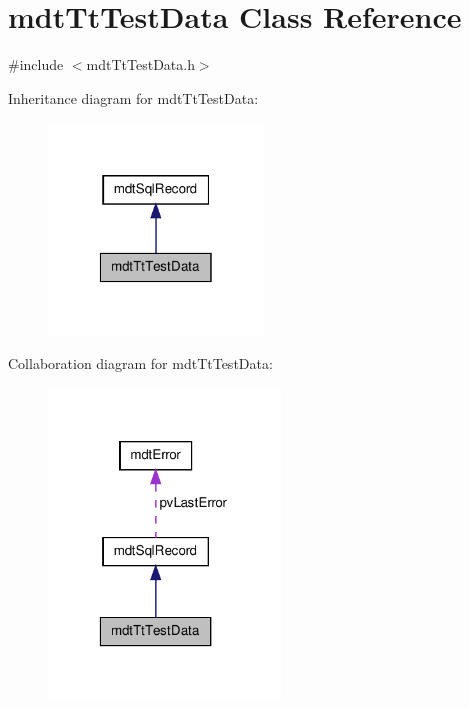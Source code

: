 \hypertarget{classmdt_tt_test_data}{\section{mdt\-Tt\-Test\-Data Class Reference}
\label{classmdt_tt_test_data}
}


{\ttfamily \#include $<$mdt\-Tt\-Test\-Data.\-h$>$}



Inheritance diagram for mdt\-Tt\-Test\-Data\-:\nopagebreak
\begin{figure}[H]
\begin{center}
\leavevmode
\includegraphics[width=162pt]{classmdt_tt_test_data__inherit__graph}
\end{center}
\end{figure}


Collaboration diagram for mdt\-Tt\-Test\-Data\-:\nopagebreak
\begin{figure}[H]
\begin{center}
\leavevmode
\includegraphics[width=175pt]{classmdt_tt_test_data__coll__graph}
\end{center}
\end{figure}
